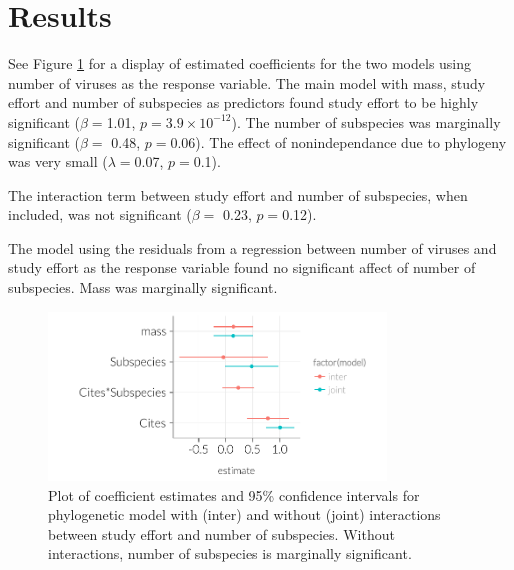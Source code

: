 
\clearpage
\section{Results}


See Figure \ref{fig:plotSubspeciesCoefs} for a display of estimated coefficients for the two models using number of viruses as the response variable. 
The main model with mass, study effort and number of subspecies as predictors found study effort to be highly significant ($\beta = $1.01, $p = $\ensuremath{3.9\times 10^{-12}}). 
The number of subspecies was marginally significant ($\beta = $ 0.48, $p = $0.06). 
The effect of nonindependance due to phylogeny was very small ($\lambda = $0.07, $p = $0.1).

The interaction term between study effort and number of subspecies, when included, was not significant ($\beta = $ 0.23, $p = $0.12).

The model using the residuals from a regression between number of viruses and study effort as the response variable found no significant affect of number of subspecies. 
Mass was marginally significant.




\begin{knitrout}\footnotesize
{}\color{fgcolor}\begin{figure}[t]

{\centering \includegraphics[width=0.8\textwidth]{figure/plotSubspeciesCoefs-1} 

}

\caption[
Plot of coefficient estimates and 95\% confidence intervals for phylogenetic model with (inter) and without (joint) interactions between study effort and number of subspecies]{
Plot of coefficient estimates and 95\% confidence intervals for phylogenetic model with (inter) and without (joint) interactions between study effort and number of subspecies. 
Without interactions, number of subspecies is marginally significant.
}\label{fig:plotSubspeciesCoefs}
\end{figure}


\end{knitrout}










